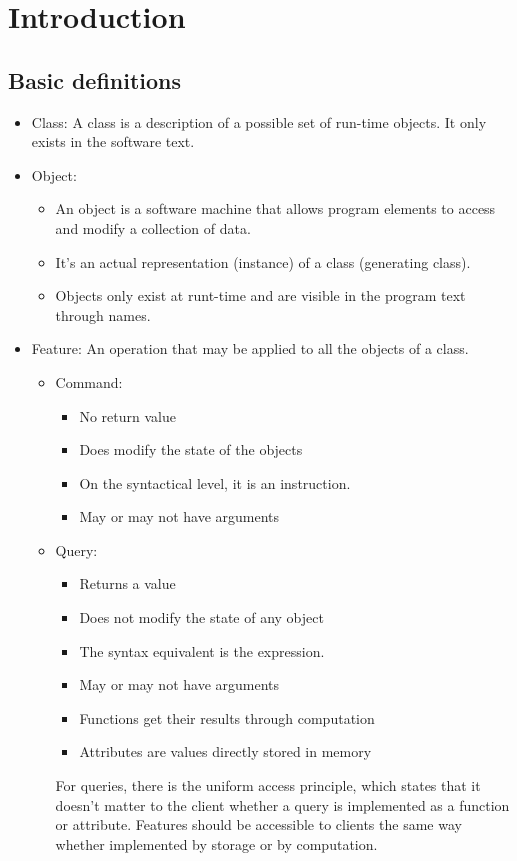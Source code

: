 \documentclass[a4paper]{article}
\begin{document}
\section{Introduction}
\subsection{Basic definitions}
\begin{itemize}
\item Class: A class is a description of a possible set of run-time objects. It only exists in the software text.
\item Object: 
\begin{itemize}
\item An object is a software machine that allows program elements to access and modify a collection of data.
\item  It's an actual representation (instance) of a class (generating class). 
\item Objects only exist at runt-time and are visible in the program text through names.
\end{itemize}\item Feature: An operation that may be applied to all the objects of a class.
\begin{itemize}
\item Command: 
\begin{itemize}
\item No return value
\item Does modify the state of the objects
\item On the syntactical level, it is an instruction. 
\item May or may not have arguments
\end{itemize}
\item Query: 
\begin{itemize}
\item Returns a value
\item Does not modify the state of any object
\item The syntax equivalent is the expression.
\item May or may not have arguments
\item Functions get their results through computation
\item Attributes are values directly stored in memory
\end{itemize}
For queries, there is the uniform access principle, which states that it doesn't matter to the client whether a query is implemented as a function or attribute. Features should be accessible to clients the same way whether implemented by storage or by computation.

\end{itemize}
\end{itemize}
\end{document}
